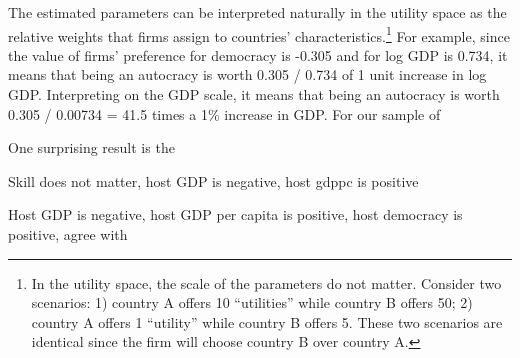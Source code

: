 The estimated parameters can be interpreted naturally in the utility space as the relative weights that firms assign to countries' characteristics.\footnote{In the utility space, the scale of the parameters do not matter. Consider two scenarios: 1) country A offers 10 ``utilities'' while country B offers 50; 2) country A offers 1 ``utility'' while country B offers 5. These two scenarios are identical since the firm will choose country B over country A.} For example, since the value of firms' preference for democracy is -0.305 and for log GDP is 0.734, it means that being an autocracy is worth 0.305 / 0.734 of 1 unit increase in log GDP. Interpreting on the GDP scale, it means that being an autocracy is worth 0.305 / 0.00734 = 41.5 times a 1\% increase in GDP. For our sample of 

One surprising result is the 




Skill does not matter, host GDP is negative, host gdppc is positive \citep{Eicher2012}

Host GDP is negative, host GDP per capita is positive, host democracy is positive, agree with 
